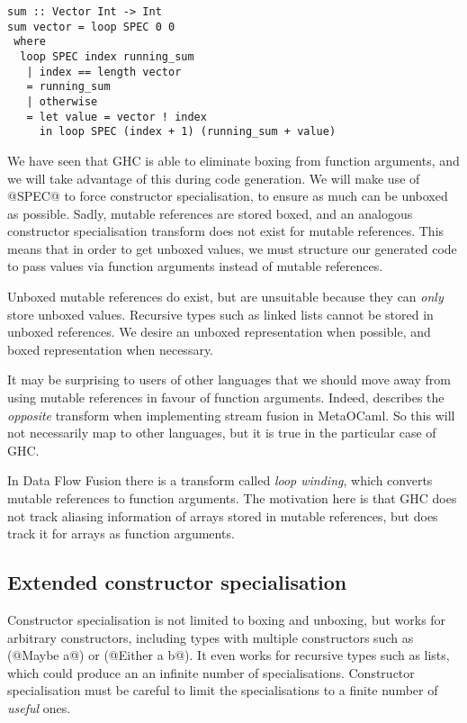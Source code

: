 \begin{lstlisting}
sum :: Vector Int -> Int
sum vector = loop SPEC 0 0
 where
  loop SPEC index running_sum
   | index == length vector
   = running_sum
   | otherwise
   = let value = vector ! index
     in loop SPEC (index + 1) (running_sum + value)
\end{lstlisting}

We have seen that GHC is able to eliminate boxing from function arguments, and we will take advantage of this during code generation.
We will make use of @SPEC@ to force constructor specialisation, to ensure as much can be unboxed as possible.
Sadly, mutable references are stored boxed, and an analogous constructor specialisation transform does not exist for mutable references.
This means that in order to get unboxed values, we must structure our generated code to pass values via function arguments instead of mutable references.

Unboxed mutable references do exist, but are unsuitable because they can \emph{only} store unboxed values.
Recursive types such as linked lists cannot be stored in unboxed references.
We desire an unboxed representation when possible, and boxed representation when necessary.

It may be surprising to users of other languages that we should move away from using mutable references in favour of function arguments.
Indeed, \citet{biboudis2017expressive} describes the \emph{opposite} transform when implementing stream fusion in MetaOCaml.
So this will not necessarily map to other languages, but it is true in the particular case of GHC.

In Data Flow Fusion \cite{lippmeier2013data} there is a transform called \emph{loop winding}, which converts mutable references to function arguments.
The motivation here is that GHC does not track aliasing information of arrays stored in mutable references, but does track it for arrays as function arguments.

\subsection{Extended constructor specialisation}

Constructor specialisation is not limited to boxing and unboxing, but works for arbitrary constructors, including types with multiple constructors such as (@Maybe a@) or (@Either a b@).
It even works for recursive types such as lists, which could produce an an infinite number of specialisations.
Constructor specialisation must be careful to limit the specialisations to a finite number of \emph{useful} ones.

